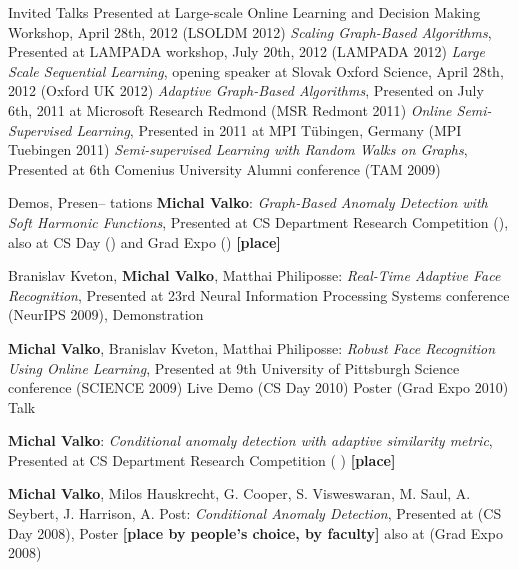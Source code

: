 \documentclass{resume}
\begin{document}
\begin{category}{Invited Talks}
Presented at Large-scale Online Learning and Decision Making Workshop,
April 28th, 2012 ({\sf LSOLDM 2012})
\citembullet
 \emph{Scaling Graph-Based Algorithms}, Presented at
LAMPADA workshop, July 20th, 2012 ({\sf LAMPADA 2012})
\citembullet
\emph{Large Scale Sequential Learning}, opening speaker at
Slovak Oxford Science, April 28th, 2012 ({\sf Oxford UK 2012})
\citembullet
 \emph{Adaptive Graph-Based Algorithms}, Presented on July
6th, 2011 at Microsoft Research Redmond ({\sf MSR Redmont 2011})
\citembullet
 \emph{Online Semi-Supervised Learning}, Presented in 2011
at MPI T\"{u}bingen, Germany ({\sf MPI Tuebingen 2011})
\citembullet
 \emph{Semi-supervised Learning with Random Walks on
Graphs}, Presented at 6th Comenius University Alumni conference ({\sf TAM 2009})
\end{category}

\begin{category}{Demos, Presen-- tations}
\citembullet
{\bf Michal Valko}:  \emph{Graph-Based Anomaly Detection with Soft Harmonic
Functions}, Presented at
CS Department Research Competition  ({}), also at CS Day ({})
and  Grad Expo ({}) {\bf [\first place]}

\citembullet
Branislav Kveton, {\bf  Michal Valko}, Matthai Philiposse:  \emph{Real-Time
Adaptive Face Recognition}, Presented at
23rd Neural Information Processing Systems conference ({\sf NeurIPS 2009}),
Demonstration

\citembullet
{\bf  Michal Valko}, Branislav Kveton, Matthai Philiposse:  \emph{Robust Face
Recognition Using Online Learning}, Presented at
9th University of Pittsburgh Science conference ({\sf SCIENCE 2009}) Live Demo
({\sf CS Day 2010}) Poster ({\sf Grad Expo 2010}) Talk

\citembullet
{\bf Michal Valko}:  \emph{Conditional anomaly detection with adaptive
similarity metric}, Presented at
CS Department Research Competition  ({ }) {\bf [\first place]}

\citembullet
{\bf Michal Valko}, Milos Hauskrecht, G. Cooper, S. Visweswaran, M. Saul, A.
Seybert,  J. Harrison, A. Post:
\emph{Conditional Anomaly Detection}, Presented at ({\sf CS Day 2008}), Poster
 {\bf[\first  place by people's choice, \second by faculty]} also at ({\sf Grad
Expo 2008})
 \end{category}

\end{document}
